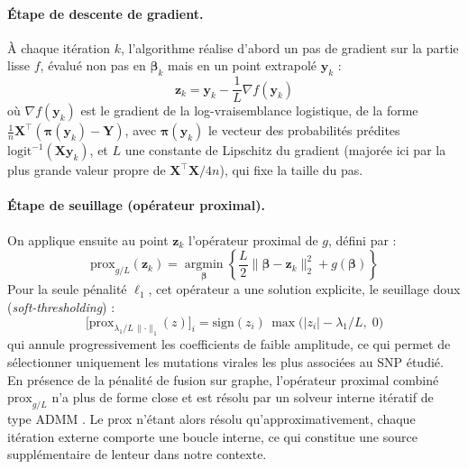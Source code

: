 \documentclass[11pt,a4paper]{article}
\begin{document}
\vspace{0.5cm}
\begin{tcolorbox}[colback=gray!5, colframe=black!60, arc=1mm, breakable, title=]

\paragraph{Étape de descente de gradient.}
À chaque itération $k$, l'algorithme réalise d'abord un pas de gradient sur
la partie lisse $f$, évalué non pas en $\boldsymbol\beta_k$ mais en un point
extrapolé $\mathbf{y}_k$ :
\[
\mathbf{z}_k = \mathbf{y}_k - \frac{1}{L} \nabla f(\mathbf{y}_k)
\]
où $\nabla f(\mathbf{y}_k)$ est le gradient de la log-vraisemblance
logistique, de la forme $\frac{1}{n}\mathbf{X}^\top (\boldsymbol\pi(\mathbf{y}_k) -
\mathbf{Y})$, avec $\boldsymbol\pi(\mathbf{y}_k)$ le vecteur des probabilités
prédites $\text{logit}^{-1}(\mathbf{X}\mathbf{y}_k)$, et $L$ une constante de
Lipschitz du gradient (majorée ici par la plus grande valeur propre de
$\mathbf{X}^\top \mathbf{X}/4n$), qui fixe la taille du pas.

\paragraph{Étape de seuillage (opérateur proximal).}
On applique ensuite au point $\mathbf{z}_k$ l'opérateur proximal de $g$,
défini par :
\[
\text{prox}_{g/L}(\mathbf{z}_k) = \operatorname*{argmin}_{\boldsymbol\beta}
\left\{ \frac{L}{2} \lVert \boldsymbol\beta - \mathbf{z}_k \rVert_2^2 +
g(\boldsymbol\beta) \right\}
\]
Pour la seule pénalité $\ell_1$, cet opérateur a une solution explicite, le
seuillage doux (\textit{soft-thresholding}) :
\[
\big[\text{prox}_{\lambda_1/L \, \lVert \cdot \rVert_1}(z)\big]_i
= \text{sign}(z_i) \, \max\big(|z_i| - \lambda_1/L,\; 0\big)
\]
qui annule progressivement les coefficients de faible amplitude, ce qui
permet de sélectionner uniquement les mutations virales les plus associées
au SNP étudié. En présence de la pénalité de fusion sur graphe, l'opérateur
proximal combiné $\text{prox}_{g/L}$ n'a plus de forme close et est résolu par un solveur interne itératif de type ADMM 
\cite{GraphFusedLasso}. Le prox n'étant alors résolu qu'approximativement, chaque
itération externe comporte une boucle interne, ce qui constitue une source
supplémentaire de lenteur dans notre contexte.


\end{tcolorbox}
\end{document}
